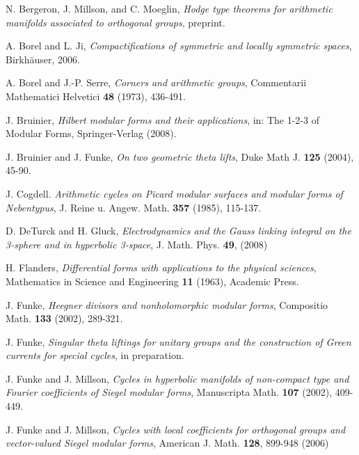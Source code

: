 \begin{thebibliography}{99}




N. Bergeron, J. Millson, and C. Moeglin, \emph{Hodge type theorems for arithmetic manifolds associated to orthogonal groups}, preprint.



A. Borel and L. Ji, \emph{Compactifications of symmetric and locally
symmetric spaces}, Birkh\"auser, 2006.



 A. Borel and J.-P. Serre, {\em Corners and arithmetic groups}, Commentarii Mathematici Helvetici \textbf{48} (1973), 436-491.





J. Bruinier, \emph{Hilbert modular forms and their applications}, in: The 1-2-3 of Modular Forms, Springer-Verlag (2008). 




J. Bruinier and J. Funke, \emph{On two geometric theta lifts}, Duke
Math J. \textbf{125} (2004), 45-90.


J. Cogdell.
\emph{Arithmetic cycles on Picard modular surfaces and modular forms of Nebentypus}, J. Reine u. Angew. Math. \textbf{357} (1985), 115-137.

D. DeTurck and H. Gluck, \emph{Electrodynamics and the Gauss linking integral on the 3-sphere and in hyperbolic 3-space}, J. Math. Phys. \textbf{49}, (2008) 

H. Flanders, \emph{Differential forms with applications to the physical sciences},
Mathematics in Science and Engineering \textbf{11} (1963), Academic Press.


J. Funke, \emph{Heegner divisors and nonholomorphic modular forms},
Compositio Math. \textbf{133} (2002), 289-321.

J. Funke, \emph{Singular theta liftings for unitary groups and the construction of Green currents for special cycles}, in preparation.



J. Funke and J. Millson, \emph{Cycles in hyperbolic manifolds of
non-compact type and Fourier coefficients of Siegel modular forms},
Manuscripta Math. \textbf{107} (2002), 409-449.


J. Funke and J. Millson, \emph{Cycles with local coefficients for
orthogonal groups and vector-valued Siegel modular forms}, American J. Math. \textbf{128}, 899-948 (2006)


\end{thebibliography}

